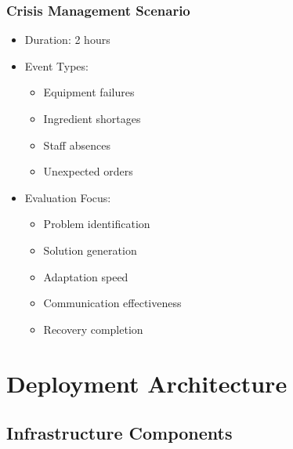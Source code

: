 \documentclass{article}
\begin{document}
\subsubsection{Crisis Management Scenario}
\begin{itemize}
    \item Duration: 2 hours
    \item Event Types:
    \begin{itemize}
        \item Equipment failures
        \item Ingredient shortages
        \item Staff absences
        \item Unexpected orders
    \end{itemize}
    \item Evaluation Focus:
    \begin{itemize}
        \item Problem identification
        \item Solution generation
        \item Adaptation speed
        \item Communication effectiveness
        \item Recovery completion
    \end{itemize}
\end{itemize}

\section{Deployment Architecture}
\label{sec:deployment}

\subsection{Infrastructure Components}
\end{document}
